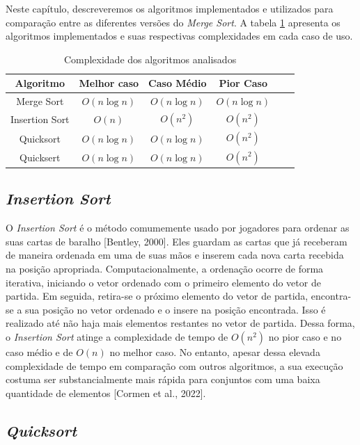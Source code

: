 \documentclass[12pt]{article}
\begin{document}
Neste capítulo, descreveremos os algoritmos implementados e utilizados para comparação entre as diferentes versões do \textit{Merge Sort}. A tabela \ref{table:alg_comp} apresenta os algoritmos implementados e suas respectivas complexidades em cada caso de uso.

\begin{table}[htpb]
\centering

\caption{Complexidade dos algoritmos analisados}
\begin{tabular}{c c c c c c}
\toprule
Algoritmo & Melhor caso & Caso Médio & Pior Caso\\
\midrule
Merge Sort & $O(n \log n)$ & $O(n \log n)$ & $O(n \log n)$ \\
Insertion Sort &$O(n)$ & $O(n^2)$  & $O(n^2)$\\
Quicksort & $O(n \log n)$ & $O(n \log n)$ & $O(n^2)$ \\
Quicksert & $O(n \log n)$ & $O(n \log n)$ & $ O(n^2)$ \\
\bottomrule
\end{tabular}
\label{table:alg_comp}
\end{table}

\subsection{\textit{Insertion Sort}}

O \textit{Insertion Sort}  é o método comumemente usado por jogadores para ordenar as suas cartas de baralho [Bentley, 2000]. Eles guardam as cartas que já receberam de maneira ordenada em uma de suas mãos e inserem cada nova carta recebida na posição apropriada. Computacionalmente, a ordenação ocorre de forma iterativa, iniciando o vetor ordenado com o primeiro elemento do vetor de partida. Em seguida, retira-se o próximo elemento do vetor de partida, encontra-se a sua posição no vetor ordenado e o insere na posição encontrada. Isso é realizado até não haja mais elementos restantes no vetor de partida. Dessa forma, o \textit{Insertion Sort} atinge a complexidade de tempo de $O(n^2)$ no pior caso e no caso médio e de $O(n)$ no melhor caso. No entanto, apesar dessa elevada complexidade de tempo em comparação com outros algoritmos, a sua execução costuma ser substancialmente mais rápida para conjuntos com uma baixa quantidade de elementos [Cormen et al., 2022].

\subsection{\textit{Quicksort}}
\end{document}
